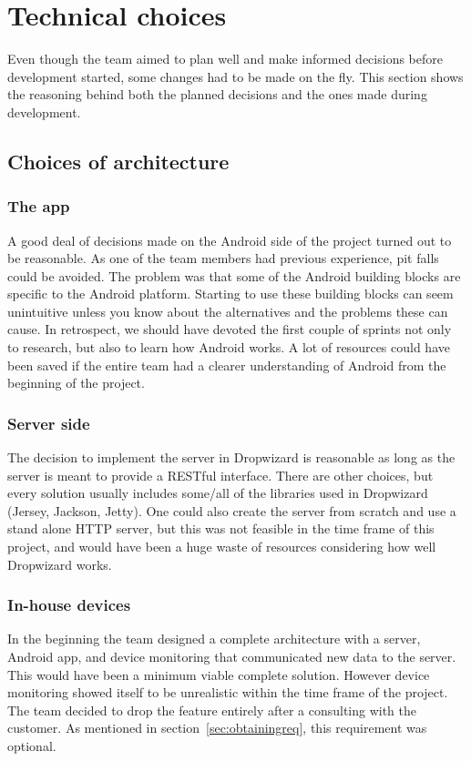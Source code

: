 \section{Technical choices}
Even though the team aimed to plan well and make informed decisions before development started, some changes had to be made on the fly. This section shows the reasoning behind both the planned decisions and the ones made during development.

\subsection{Choices of architecture}
\subsubsection{The app}
A good deal of decisions made on the Android side of the project turned out to be reasonable. As one of the team members had previous experience, pit falls could be avoided. The problem was that some of the Android building blocks are specific to the Android platform. Starting to use these building blocks can seem unintuitive unless you know about the alternatives and the problems these can cause. In retrospect, we should have devoted the first couple of sprints not only to research, but also to learn how Android works. A lot of resources could have been saved if the entire team had a clearer understanding of Android from the beginning of the project.

\subsubsection{Server side}

The decision to implement the server in Dropwizard is reasonable as long as the server is meant to provide a RESTful interface. There are other choices, but every solution usually includes some/all of the libraries used in Dropwizard (Jersey, Jackson, Jetty). One could also create the server from scratch and use a stand alone HTTP server, but this was not feasible in the time frame of this project, and would have been a huge waste of resources considering how well Dropwizard works.

\subsubsection{In-house devices}
In the beginning the team designed a complete architecture with a server, Android app, and device monitoring that communicated new data to the server. This would have been a minimum viable complete solution. However device monitoring showed itself to be unrealistic within the time frame of the project. The team decided to drop the feature entirely after a consulting with the customer. As mentioned in section~\ref{sec:obtainingreq}, this requirement was optional.

